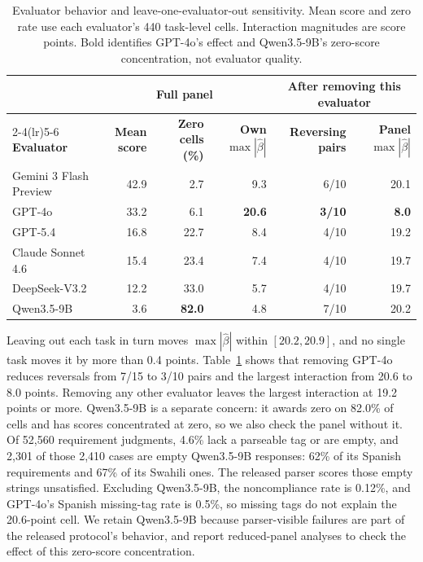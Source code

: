 \documentclass[sigconf,anonymous]{aamas}
\begin{document}
\begin{table}[t]\centering\small
\caption{Evaluator behavior and leave-one-evaluator-out sensitivity.
Mean score and zero rate use each evaluator's 440 task-level cells.
Interaction magnitudes are score points. Bold identifies GPT-4o's effect
and Qwen3.5-9B's zero-score concentration, not evaluator quality.}
\label{tab:panel}
\begin{tabular*}{\textwidth}{@{\extracolsep{\fill}}lrrrrr@{}}
\toprule
 & \multicolumn{3}{c}{\textbf{Full panel}} & \multicolumn{2}{c}{\textbf{After removing this evaluator}}\\
\cmidrule(lr){2-4}\cmidrule(lr){5-6}
\textbf{Evaluator} & \textbf{Mean score} & \textbf{Zero cells (\%)} & \textbf{Own} $\max|\hat\beta|$ & \textbf{Reversing pairs} & \textbf{Panel} $\max|\hat\beta|$\\
\midrule
Gemini 3 Flash Preview & 42.9 &  2.7 &  9.3 & 6/10 & 20.1\\
GPT-4o   & 33.2 &  6.1 & \textbf{20.6} & \textbf{3/10} & \textbf{8.0}\\
GPT-5.4  & 16.8 & 22.7 &  8.4 & 4/10 & 19.2\\
Claude Sonnet 4.6 & 15.4 & 23.4 &  7.4 & 4/10 & 19.7\\
DeepSeek-V3.2 & 12.2 & 33.0 &  5.7 & 4/10 & 19.7\\
Qwen3.5-9B &  3.6 & \textbf{82.0} &  4.8 & 7/10 & 20.2\\
\bottomrule
\end{tabular*}
\end{table}

Leaving out each task in turn moves
$\max|\hat\beta|$ within $[20.2,20.9]$, and no single task moves it by more
than 0.4 points. Table~\ref{tab:panel} shows that removing GPT-4o
reduces reversals from 7/15 to 3/10
pairs and the largest interaction from 20.6 to 8.0 points. Removing any
other evaluator leaves the largest interaction at 19.2 points or more.
Qwen3.5-9B is a separate concern: it awards zero on 82.0\% of cells and
has scores concentrated at zero, so we also check the panel without it.
Of 52{,}560 requirement judgments, 4.6\% lack a parseable tag or are empty, and
2{,}301 of those 2{,}410 cases are empty Qwen3.5-9B responses: 62\% of its Spanish
requirements and 67\% of its Swahili ones. The released parser scores those
empty strings unsatisfied. Excluding Qwen3.5-9B, the noncompliance rate is 0.12\%,
and GPT-4o's Spanish missing-tag rate is 0.5\%, so missing tags do not
explain the 20.6-point cell. We retain Qwen3.5-9B because parser-visible
failures are part of the released protocol's behavior, and report
reduced-panel analyses to check the effect of this zero-score concentration.
\end{document}
